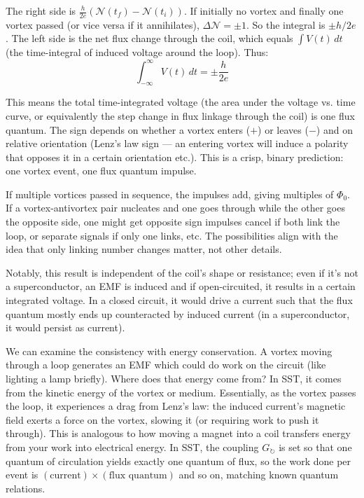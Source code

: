 \documentclass[10pt,reprint,aps,onecolumn,nofootinbib]{revtex4-2}
\begin{document}
The right side is $\frac{h}{2e} (\mathcal{N}(t_f) - \mathcal{N}(t_i))$. If initially no vortex and finally one vortex passed (or vice versa if it annihilates), $\Delta \mathcal{N} = \pm 1$. So the integral is $\pm h/2e$. The left side is the net flux change through the coil, which equals $\int V(t) \, dt$ (the time-integral of induced voltage around the loop). Thus:
\begin{equation}
\int_{-\infty}^{\infty} V(t) \, dt = \pm \frac{h}{2e}
\label{eq:voltageImpulse}
\end{equation}

This means the total time-integrated voltage (the area under the voltage vs. time curve, or equivalently the step change in flux linkage through the coil) is one flux quantum. The sign depends on whether a vortex enters ($+$) or leaves ($-$) and on relative orientation (Lenz’s law sign — an entering vortex will induce a polarity that opposes it in a certain orientation etc.). This is a crisp, binary prediction: one vortex event, one flux quantum impulse.

If multiple vortices passed in sequence, the impulses add, giving multiples of $\Phi_0$. If a vortex-antivortex pair nucleates and one goes through while the other goes the opposite side, one might get opposite sign impulses cancel if both link the loop, or separate signals if only one links, etc. The possibilities align with the idea that only linking number changes matter, not other details.

Notably, this result is independent of the coil’s shape or resistance; even if it’s not a superconductor, an EMF is induced and if open-circuited, it results in a certain integrated voltage. In a closed circuit, it would drive a current such that the flux quantum mostly ends up counteracted by induced current (in a superconductor, it would persist as current).

We can examine the consistency with energy conservation. A vortex moving through a loop generates an EMF which could do work on the circuit (like lighting a lamp briefly). Where does that energy come from? In SST, it comes from the kinetic energy of the vortex or medium. Essentially, as the vortex passes the loop, it experiences a drag from Lenz’s law: the induced current’s magnetic field exerts a force on the vortex, slowing it (or requiring work to push it through). This is analogous to how moving a magnet into a coil transfers energy from your work into electrical energy. In SST, the coupling $G_{\circlearrowright}$ is set so that one quantum of circulation yields exactly one quantum of flux, so the work done per event is $(\text{current}) \times (\text{flux quantum})$ and so on, matching known quantum relations.
\end{document}
